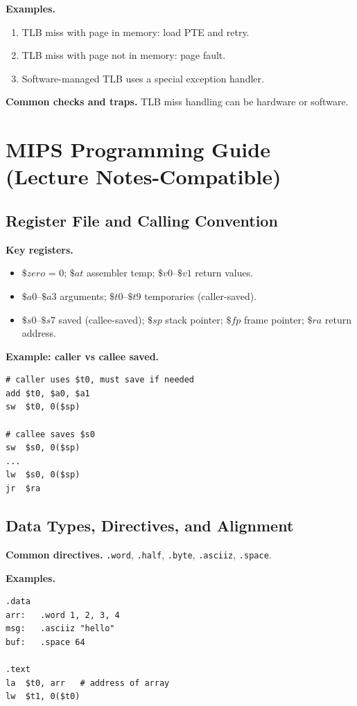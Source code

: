 \documentclass[11pt]{article}
\begin{document}
\textbf{Examples.}
\begin{enumerate}[leftmargin=*]
  \item TLB miss with page in memory: load PTE and retry.
  \item TLB miss with page not in memory: page fault.
  \item Software-managed TLB uses a special exception handler.
\end{enumerate}

\textbf{Common checks and traps.} TLB miss handling can be hardware or software.

\appendix
\section{MIPS Programming Guide (Lecture Notes-Compatible)}

\subsection{Register File and Calling Convention}
\textbf{Key registers.}
\begin{itemize}[leftmargin=*]
  \item $\$zero$ = 0; $\$at$ assembler temp; $\$v0$--$\$v1$ return values.
  \item $\$a0$--$\$a3$ arguments; $\$t0$--$\$t9$ temporaries (caller-saved).
  \item $\$s0$--$\$s7$ saved (callee-saved); $\$sp$ stack pointer; $\$fp$ frame pointer; $\$ra$ return address.
\end{itemize}

\textbf{Example: caller vs callee saved.}
\begin{verbatim}
# caller uses $t0, must save if needed
add $t0, $a0, $a1
sw  $t0, 0($sp)

# callee saves $s0
sw  $s0, 0($sp)
...
lw  $s0, 0($sp)
jr  $ra
\end{verbatim}

\subsection{Data Types, Directives, and Alignment}
\textbf{Common directives.} \texttt{.word}, \texttt{.half}, \texttt{.byte}, \texttt{.asciiz}, \texttt{.space}.

\textbf{Examples.}
\begin{verbatim}
.data
arr:   .word 1, 2, 3, 4
msg:   .asciiz "hello"
buf:   .space 64

.text
la  $t0, arr   # address of array
lw  $t1, 0($t0)
\end{verbatim}
\end{document}

